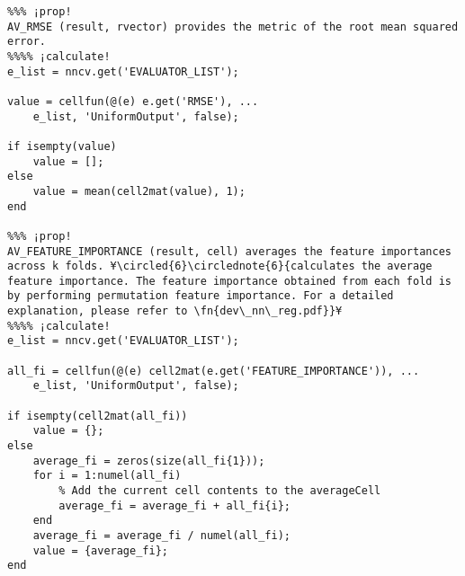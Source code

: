 \documentclass{tufte-handout}
\begin{document}
\begin{lstlisting}
%%% ¡prop!
AV_RMSE (result, rvector) provides the metric of the root mean squared error. 
%%%% ¡calculate!
e_list = nncv.get('EVALUATOR_LIST');

value = cellfun(@(e) e.get('RMSE'), ...
    e_list, 'UniformOutput', false);

if isempty(value)
    value = [];
else
    value = mean(cell2mat(value), 1);
end

%%% ¡prop!
AV_FEATURE_IMPORTANCE (result, cell) averages the feature importances across k folds. ¥\circled{6}\circlednote{6}{calculates the average feature importance. The feature importance obtained from each fold is by performing permutation feature importance. For a detailed explanation, please refer to \fn{dev\_nn\_reg.pdf}}¥
%%%% ¡calculate!
e_list = nncv.get('EVALUATOR_LIST');

all_fi = cellfun(@(e) cell2mat(e.get('FEATURE_IMPORTANCE')), ...
    e_list, 'UniformOutput', false);

if isempty(cell2mat(all_fi))
    value = {};
else
    average_fi = zeros(size(all_fi{1}));
    for i = 1:numel(all_fi)
        % Add the current cell contents to the averageCell
        average_fi = average_fi + all_fi{i};
    end
    average_fi = average_fi / numel(all_fi);
    value = {average_fi};
end
\end{lstlisting}

\clearpage
\end{document}
